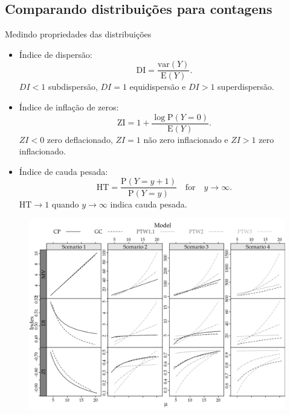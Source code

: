 \documentclass[10pt, aspectratio=169]{beamer}\usepackage[]{graphicx}\usepackage[]{color}
\begin{document}
\subsection{Comparando distribuições para contagens}
\begin{frame}{Medindo propriedades das distribuições}
\begin{itemize}

\item Índice de dispersão: $$\mathrm{DI} = \frac{\mathrm{var}(Y)}{\mathrm{E}(Y)}.$$
$ DI < 1$ subdispersão, $DI = 1$ equidispersão e $DI > 1$ superdispersão.
\vspace{0,5cm}
\item Índice de inflação de zeros: $$\mathrm{ZI} = 1 + \frac{\log \mathrm{P}(Y = 0)}{\mathrm{E}(Y)}.$$
$ZI < 0$ zero deflacionado, $ZI=1$ não zero inflacionado e $ZI > 1$ zero inflacionado.
\vspace{0,5cm}
\item Índice de cauda pesada:
$$ \mathrm{HT} = \frac{\mathrm{P}(Y=y+1)}{\mathrm{P}(Y=y)}\quad \text{for} \quad y \to \infty.$$
$\mathrm{HT} \to 1$ quando $y \to \infty$ indica cauda pesada.
\end{itemize}
\end{frame}

\begin{frame}[fragile]
\begin{figure}[h]
\includegraphics[scale=0.5]{images/Compara.png}
\caption{}
\label{Fig3}
\centering
\end{figure}
\end{frame}
\end{document}
